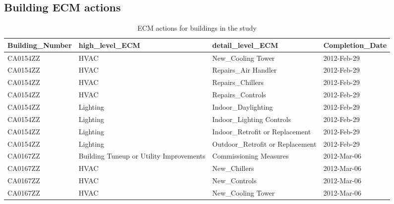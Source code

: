 \documentclass[12pt]{article}
\begin{document}
\subsection{Building ECM actions}
\begin{longtable}{lp{4cm}p{4cm}p{3cm}}
\caption{ECM actions for buildings in the study}\\
\label{tab:energy_avail}
Building\_Number & high\_level\_ECM                        & detail\_level\_ECM                        & Completion\_Date \\ \hline \hline \endhead
CA0154ZZ         & HVAC                                    & New\_Cooling Tower                        & 2012-Feb-29                   \\
CA0154ZZ         & HVAC                                    & Repairs\_Air Handler                      & 2012-Feb-29                   \\
CA0154ZZ         & HVAC                                    & Repairs\_Chillers                         & 2012-Feb-29                   \\
CA0154ZZ         & HVAC                                    & Repairs\_Controls                         & 2012-Feb-29                   \\
CA0154ZZ         & Lighting                                & Indoor\_Daylighting                       & 2012-Feb-29                   \\
CA0154ZZ         & Lighting                                & Indoor\_Lighting Controls                 & 2012-Feb-29                   \\
CA0154ZZ         & Lighting                                & Indoor\_Retrofit or Replacement           & 2012-Feb-29                   \\
CA0154ZZ         & Lighting                                & Outdoor\_Retrofit or Replacement          & 2012-Feb-29                   \\
CA0167ZZ         & Building Tuneup or Utility Improvements & Commissioning Measures                    & 2012-Mar-06                   \\
CA0167ZZ         & HVAC                                    & New\_Chillers                             & 2012-Mar-06                   \\
CA0167ZZ         & HVAC                                    & New\_Controls                             & 2012-Mar-06                   \\
CA0167ZZ         & HVAC                                    & New\_Cooling Tower                        & 2012-Mar-06                   \\

\end{longtable}
\end{document}
